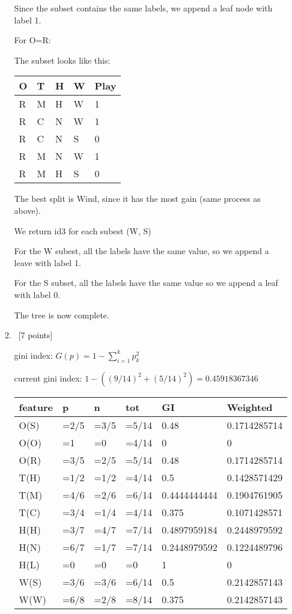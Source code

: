 \documentclass[12pt, fullpage,letterpaper]{article}
\begin{document}
\begin{enumerate}
\begin{enumerate}
		
		Since the subset contains the same labels, we append a leaf node with label 1.
		
		For O=R:
		
		The subset looks like this:
		
		\begin{tabular}{|l|l|l|l|l|}
			\hline
			O & T & H & W & Play \\ \hline
			R & M & H & W & 1    \\ \hline
			R & C & N & W & 1    \\ \hline
			R & C & N & S & 0    \\ \hline
			R & M & N & W & 1    \\ \hline
			R & M & H & S & 0    \\ \hline
			\end{tabular}
		
		
		The best split is Wind, since it has the most gain (same process as above).
		
		We return id3 for each subest (W, S)
		
		For the W subest, all the labels have the same value, so we append a leave with label 1.
		
		For the S subset, all the labels have the same value so we append a leaf with label 0.
		
		The tree is now complete.
	\item~[7 points] 

	gini index: $G(p)=1-\sum^k_{i=1}p_k^2$

	current gini index: $1-((9/14)^2 + (5/14)^2)=0.45918367346	$

	\begin{tabular}{|l|l|l|l|l|l|}
		\hline
		feature & p    & n    & tot   & GI      & Weighted     \\ \hline
		O(S)    & =2/5 & =3/5 & =5/14 & 0.48         & 0.1714285714 \\ \hline
		O(O)    & =1   & =0   & =4/14 & 0            & 0            \\ \hline
		O(R)    & =3/5 & =2/5 & =5/14 & 0.48         & 0.1714285714 \\ \hline
		T(H)    & =1/2 & =1/2 & =4/14 & 0.5          & 0.1428571429 \\ \hline
		T(M)    & =4/6 & =2/6 & =6/14 & 0.4444444444 & 0.1904761905 \\ \hline
		T(C)    & =3/4 & =1/4 & =4/14 & 0.375        & 0.1071428571 \\ \hline
		H(H)    & =3/7 & =4/7 & =7/14 & 0.4897959184 & 0.2448979592 \\ \hline
		H(N)    & =6/7 & =1/7 & =7/14 & 0.2448979592 & 0.1224489796 \\ \hline
		H(L)    & =0   & =0   & =0    & 1            & 0            \\ \hline
		W(S)    & =3/6 & =3/6 & =6/14 & 0.5          & 0.2142857143 \\ \hline
		W(W)    & =6/8 & =2/8 & =8/14 & 0.375        & 0.2142857143  \\ \hline
		\end{tabular}
	

\end{enumerate}
\end{enumerate}
\end{document}
